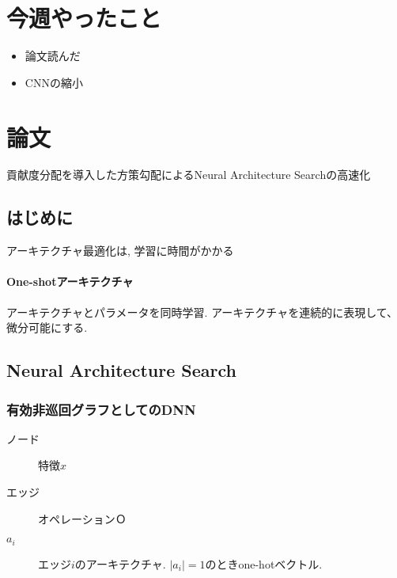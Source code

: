 \documentclass[twocolumn]{jarticle}     %
\begin{document}


\section{今週やったこと}
\begin{itemize}
	\item {論文読んだ}
	\item {CNNの縮小}
\end{itemize}

\section{論文}
貢献度分配を導入した方策勾配によるNeural Architecture Searchの高速化\cite{ANAS}

\subsection{はじめに}
アーキテクチャ最適化は, 学習に時間がかかる
\paragraph{One-shotアーキテクチャ}
アーキテクチャとパラメータを同時学習.
アーキテクチャを連続的に表現して、微分可能にする.

\subsection{Neural Architecture Search}
\subsubsection{有効非巡回グラフとしてのDNN}
\begin{description}
  \item[ノード] 特徴$x$
  \item[エッジ] オペレーション$Ｏ$
  \item[$a_i$] エッジ$i$のアーキテクチャ. $|a_i|=1$のときone-hotベクトル.
\end{description}
\end{document}
